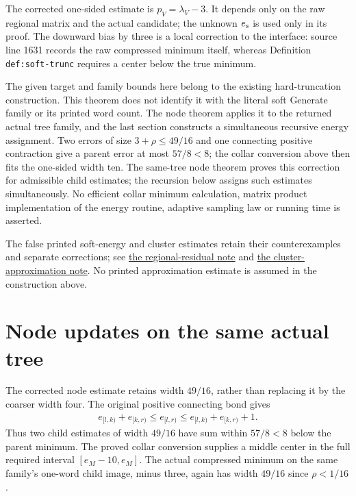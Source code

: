 \documentclass{article}
\begin{document}
The corrected one-sided estimate is $p_V=\lambda_V-3$. It depends only
on the raw regional matrix and the actual candidate; the unknown
$e_{\rm s}$ is used only in its proof. The downward bias by three is a
local correction to the interface: source line 1631 records the raw
compressed minimum itself, whereas Definition \texttt{def:soft-trunc}
requires a center below the true minimum.

The given target and family bounds here belong to the existing
hard-truncation construction. This theorem does not identify it with the
literal soft Generate family or its printed word count. The node theorem
applies it to the returned actual tree family, and the last section
constructs a simultaneous recursive energy assignment. Two errors of size $3+\rho\le49/16$ and one
connecting positive contraction give a parent error at most $57/8<8$;
the collar conversion above then fits the one-sided width ten. The
same-tree node theorem proves this correction for admissible child
estimates; the recursion below assigns such estimates simultaneously.
No efficient collar minimum calculation, matrix product implementation of
the energy routine,
adaptive sampling law or running time is asserted.

The false printed soft-energy and cluster estimates retain their
counterexamples and separate corrections; see
\href{https://sirui-lu.com/TNLean/paper-gaps/alvv16_soft_regional_residuals.pdf}{the regional-residual note}
and
\href{https://sirui-lu.com/TNLean/paper-gaps/alvv16_cluster_approximation.pdf}{the cluster-approximation note}.
No printed approximation estimate is assumed in the construction above.



\section{Node updates on the same actual tree}

The corrected node estimate retains width $49/16$, rather than replacing
it by the coarser width four. The original positive connecting bond gives
\begin{align}
 e_{[l,k)}+e_{[k,r)}\le e_{[l,r)}
 \le e_{[l,k)}+e_{[k,r)}+1.
\end{align}
Thus two child estimates of width $49/16$ have sum within $57/8<8$
below the parent minimum. The proved collar conversion supplies a middle
center in the full required interval $[e_M-10,e_M]$. The actual compressed
minimum on the same family's one-word child image, minus three, again
has width $49/16$ since $\rho<1/16$.
\end{document}

